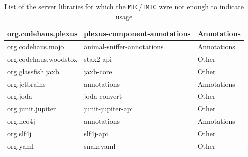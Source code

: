 \begin{table}[ht]
\begin{center}
\begin{tabular}{|l|l|l|}
org.codehaus.plexus         & plexus-component-annotations    & Annotations \\\hline
org.codehaus.mojo           & animal-sniffer-annotations      & Annotations \\\hline
org.codehaus.woodstox       & stax2-api                       & Other       \\\hline
org.glassfish.jaxb          & jaxb-core                       & Other       \\\hline
org.jetbrains               & annotations                     & Annotations \\\hline
org.joda                    & joda-convert                    & Other       \\\hline
org.junit.jupiter           & junit-jupiter-api               & Other       \\\hline
org.neo4j                   & annotations                     & Annotations \\\hline
org.slf4j                   & slf4j-api                       & Other       \\\hline %
org.yaml                    & snakeyaml                       & Other       \\\hline
\end{tabular}
\end{center}
\caption{List of the server libraries for which the \texttt{MIC}/\texttt{TMIC} were not enough to indicate usage}
\label{table:significance-mic}
\end{table}


